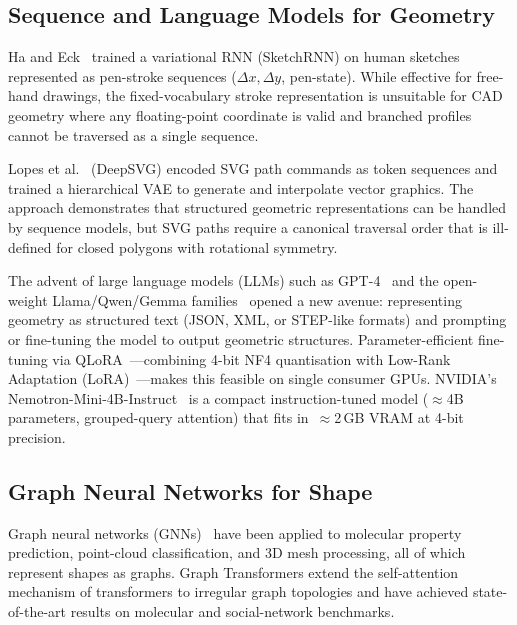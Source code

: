 \documentclass[journal]{IEEEtran}
\begin{document}
\subsection{Sequence and Language Models for Geometry}

Ha and Eck~\cite{ha2018sketchrnn} trained a variational RNN (SketchRNN) on
human sketches represented as pen-stroke sequences ($\Delta x, \Delta y$,
pen-state).  While effective for free-hand drawings, the fixed-vocabulary stroke
representation is unsuitable for CAD geometry where any floating-point
coordinate is valid and branched profiles cannot be traversed as a single
sequence.

Lopes et al.~\cite{deepsvg2020} (DeepSVG) encoded SVG path commands as token
sequences and trained a hierarchical VAE to generate and interpolate vector
graphics.  The approach demonstrates that structured geometric representations
can be handled by sequence models, but SVG paths require a canonical traversal
order that is ill-defined for closed polygons with rotational symmetry.

The advent of large language models (LLMs) such as GPT-4~\cite{openai2023gpt4}
and the open-weight Llama/Qwen/Gemma families~\cite{touvron2023llama,
qwen2023qwen} opened a new avenue: representing geometry as structured text
(JSON, XML, or STEP-like formats) and prompting or fine-tuning the model to
output geometric structures.  Parameter-efficient fine-tuning via
QLoRA~\cite{dettmers2023qlora}—combining 4-bit NF4 quantisation with Low-Rank
Adaptation (LoRA)~\cite{hu2022lora}—makes this feasible on single consumer
GPUs.  NVIDIA's Nemotron-Mini-4B-Instruct~\cite{nvidia2024nemotron} is a
compact instruction-tuned model ($\approx$4B parameters, grouped-query
attention) that fits in~$\approx$2\,GB VRAM at 4-bit precision.

\subsection{Graph Neural Networks for Shape}

Graph neural networks (GNNs)~\cite{kipf2017gcn,velivckovic2018gat} have been
applied to molecular property prediction, point-cloud classification, and 3D
mesh processing, all of which represent shapes as graphs.  Graph Transformers
\cite{shi2020masked,dwivedi2022graphtransformer} extend the self-attention
mechanism of transformers to irregular graph topologies and have achieved
state-of-the-art results on molecular and social-network benchmarks.
\end{document}
